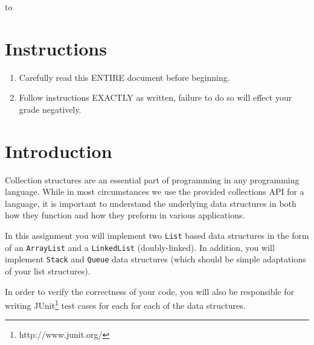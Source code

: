 \documentclass[11pt]{exam}
\begin{document}
\begin{center} 
\end{center} 

\lstset{language=Python,numbers=left}

\vspace{0.1in} 
\hbox to \textwidth{Name:\enspace\hrulefill} 

\section*{Instructions}
\begin{enumerate}
   \item Carefully read this ENTIRE document before beginning.
   \item Follow instructions EXACTLY as written, failure to do so will effect your grade negatively.
\end{enumerate}

\section*{Introduction}
Collection structures are an essential part of programming in any programming language.   While in most circumstances we use the provided collections API for a language, it is important to understand the underlying data structures in both how they function and how they preform in various applications.
\par
In this assignment you will implement two {\tt List} based data structures in the form of an {\tt ArrayList} and a {\tt LinkedList} (doubly-linked).    In addition, you will implement {\tt Stack} and {\tt Queue} data structures (which should be simple adaptations of your list structures).
\par
In order to verify the correctness of your code, you will also be responsible for writing JUnit\footnote{http://www.junit.org/} test cases for each for each of the data structures.
\end{document}
